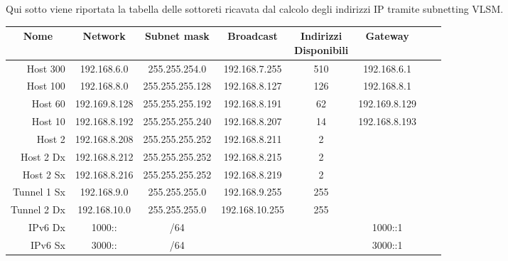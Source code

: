 Qui sotto viene riportata la tabella delle sottoreti ricavata dal calcolo degli indirizzi IP tramite subnetting VLSM.

\smallskip

\begin{adjustbox}{center}
    \begin{tabular}{rccccccc}
        \toprule
        \multicolumn{1}{c}{Nome} & Network & Subnet mask & Broadcast & \shortstack{Indirizzi\\Disponibili} & Gateway\\
        \midrule 
        Host 300    & 192.168.6.0   & 255.255.254.0   & 192.168.7.255  & 510 & 192.168.6.1\\
        Host 100    & 192.168.8.0   & 255.255.255.128 & 192.168.8.127  & 126 & 192.168.8.1\\
        Host 60     & 192.169.8.128 & 255.255.255.192 & 192.168.8.191  & 62  & 192.169.8.129\\
        Host 10     & 192.168.8.192 & 255.255.255.240 & 192.168.8.207  & 14  & 192.168.8.193\\
        Host 2      & 192.168.8.208 & 255.255.255.252 & 192.168.8.211  & 2   &\\
        Host 2 Dx   & 192.168.8.212 & 255.255.255.252 & 192.168.8.215  & 2   &\\
        Host 2 Sx   & 192.168.8.216 & 255.255.255.252 & 192.168.8.219  & 2   &\\
        Tunnel 1 Sx & 192.168.9.0   & 255.255.255.0   & 192.168.9.255  & 255 &\\
        Tunnel 2 Dx & 192.168.10.0  & 255.255.255.0   & 192.168.10.255 & 255 &\\
        IPv6 Dx     & 1000::        & /64             &                &     & 1000::1\\
        IPv6 Sx     & 3000::        & /64             &                &     & 3000::1\\
        \bottomrule
    \end{tabular}%
\end{adjustbox}